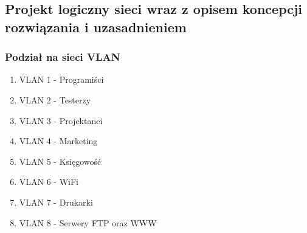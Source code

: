 \documentclass[a4paper,12pt]{extarticle}  %
\begin{document}
\subsection{Projekt logiczny sieci wraz z opisem koncepcji rozwiązania i uzasadnieniem}
\begin{figure}[H]
   \centering
\end{figure}
\cleardoublepage
\subsubsection{Podział na sieci VLAN}
\begin{enumerate}
	\item VLAN 1 - Programiści
	\item VLAN 2 - Testerzy
	\item VLAN 3 - Projektanci
	\item VLAN 4 - Marketing
	\item VLAN 5 - Księgowość
	\item VLAN 6 - WiFi
	\item VLAN 7 - Drukarki
	\item VLAN 8 - Serwery FTP oraz WWW
\end{enumerate}
\end{document}
